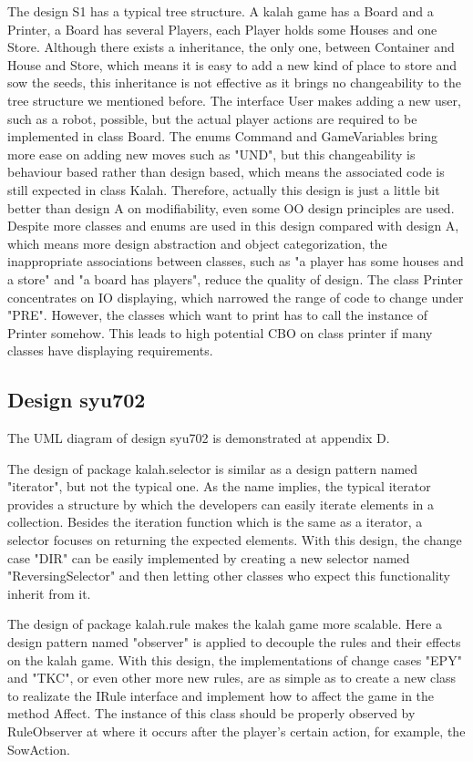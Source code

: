 \documentclass[conference]{IEEEtran}
\begin{document}
	The design S1 has a typical tree structure. A kalah game has a Board and a Printer, a Board has several Players, each Player holds some Houses and one Store. Although there exists a inheritance, the only one, between Container and House and Store, which means it is easy to add a new kind of place to store and sow the seeds, this inheritance is not effective as it brings no changeability to the tree structure we mentioned before. The interface User makes adding a new user, such as a robot, possible, but the actual player actions are required to be implemented in class Board. The enums Command and GameVariables bring more ease on adding new moves such as "UND", but this changeability is behaviour based rather than design based, which means the associated code is still expected in class Kalah. Therefore, actually this design is just a little bit better than design A on modifiability, even some \gls{OO} design principles are used. Despite more classes and enums are used in this design compared with design A, which means more design abstraction and object categorization, the inappropriate associations between classes, such as "a player has some houses and a store" and "a board has players", reduce the quality of design. The class Printer concentrates on IO displaying, which narrowed the range of code to change under "PRE". However, the classes which want to print has to call the instance of Printer somehow. This leads to high potential \gls{CBO} on class printer if many classes have displaying requirements.
	
	\subsection{Design syu702}	
	The UML diagram of design syu702 is demonstrated at appendix D.
		
	The design of package kalah.selector is similar as a design pattern named "iterator", but not the typical one. As the name implies, the typical iterator provides a structure by which the developers can easily iterate elements in a collection. Besides the iteration function which is the same as a iterator, a selector focuses on returning the expected elements. With this design, the change case "DIR" can be easily implemented by creating a new selector named "ReversingSelector" and then letting other classes who expect this functionality inherit from it.
	
	The design of package kalah.rule makes the kalah game more scalable. Here a design pattern named "observer" is applied to decouple the rules and their effects on the kalah game. With this design, the implementations of change cases "EPY" and "TKC", or even other more new rules, are as simple as to create a new class to realizate the IRule interface and implement how to affect the game in the method Affect. The instance of this class should be properly observed by RuleObserver at where it occurs after the player's certain action, for example, the SowAction.
	
\end{document}
